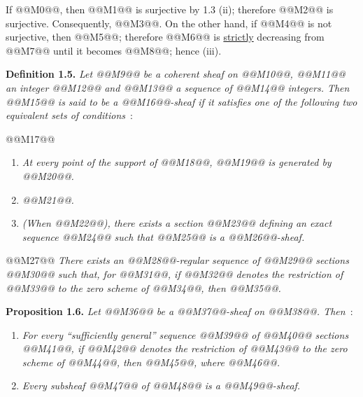 If @@M0@@, then @@M1@@ is surjective by 1.3 (ii); therefore @@M2@@ is surjective. Consequently, @@M3@@. On the other hand, if @@M4@@ is not surjective, then @@M5@@; therefore @@M6@@ is \uline{strictly} decreasing from @@M7@@ until it becomes @@M8@@; hence (iii).

\textbf{Definition 1.5.} \emph{Let @@M9@@ be a coherent sheaf on @@M10@@, @@M11@@ an integer @@M12@@ and @@M13@@ a sequence of @@M14@@ integers. Then @@M15@@ is said to be a \emph{@@M16@@-sheaf} if it satisfies one of the following two equivalent sets of conditions}~:

@@M17@@
\begin{enumerate}[label=(\roman*)]
\item \emph{At every point of the support of @@M18@@, @@M19@@ is generated by @@M20@@.}
\item \emph{@@M21@@.}
\item \emph{(When @@M22@@), there exists a section @@M23@@ defining an exact sequence @@M24@@ such that @@M25@@ is a @@M26@@-sheaf.}
\end{enumerate}

@@M27@@ \emph{There exists an @@M28@@-regular sequence of @@M29@@ sections @@M30@@ such that, for @@M31@@, if @@M32@@ denotes the restriction of @@M33@@ to the zero scheme of @@M34@@, then @@M35@@.}

\textbf{Proposition 1.6.} \emph{Let @@M36@@ be a @@M37@@-sheaf on @@M38@@. Then}~:
\begin{enumerate}[label=(\roman*)]
\item \emph{For every ``sufficiently general'' sequence @@M39@@ of @@M40@@ sections @@M41@@, if @@M42@@ denotes the restriction of @@M43@@ to the zero scheme of @@M44@@, then @@M45@@, where @@M46@@.}
\item \emph{Every subsheaf @@M47@@ of @@M48@@ is a @@M49@@-sheaf.}
\end{enumerate}

